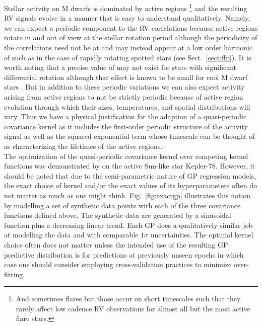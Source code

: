 Stellar activity on M dwarfs
is dominated by active regions \citep{lindegren03}\footnote{And sometimes flares but those
  occur on short timescales such that they rarely affect low cadence RV observations for almost
  all but the most active flare stars.} and the resulting RV signals evolve in a manner that
is easy to understand qualitatively. Namely, we can expect a periodic component to the
RV correlations because active regions rotate in and out of view at the stellar rotation period
although the periodicity of the correlations need not be at \prot{} and may instead appear
at a low order harmonic of \prot{} such as in the case of rapidly rotating spotted stars 
(see Sect.~\ref{sect:ffp}). It is worth noting that a precise value of \prot{} may not exist 
for stars with significant differential rotation although that effect is known to be small 
for cool M dwarf stars \citep{barnes05}.
But in addition to these periodic variations we can also expect activity
arising from active regions to not be strictly periodic because of active region evolution through
which their sizes, temperatures, and spatial distributions will vary. Thus we
have a physical justification for the adaption of a
quasi-periodic covariance kernel as it includes the first-order periodic structure of the activity
signal as well as the squared exponential term
whose timescale can be thought of as characterizing the lifetimes of the active regions. \\

The optimization of the quasi-periodic covariance kernel over competing kernel functions
was demonstrated by \cite{grunblatt15} on the active Sun-like star Kepler-78. However, it
should be noted that due to the semi-parametric nature of GP regression models, the exact
choice of kernel and/or the exact values of its hyperparameters often do not matter as
much as one might think. Fig.~\ref{fig:exactgp} illustrates this notion by modelling a
set of synthetic data points with each of the three covariance functions defined above.
The synthetic data are generated by a sinusoidal function plus a decreasing linear trend. 
Each GP does a qualitatively similar job at modelling the data and with comparable $1\sigma$
uncertainties. The optimal kernel choice often does not matter unless the intended use of the 
resulting GP predictive distribution is for predictions at previously unseen epochs in which case 
one should consider employing cross-validation practices to minimize over-fitting. \\

